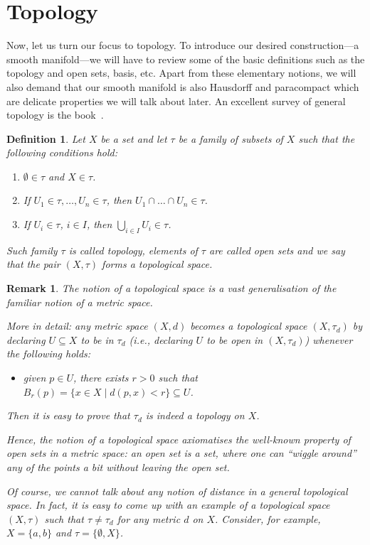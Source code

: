 \documentclass[11pt,a4paper,twoside,openany]{report}
\theoremstyle{my-theorem}
\theoremstyle{non-theorem}
\newtheorem{definition}[theorem]{Definition}
\newtheorem{remark}[theorem]{Remark}
\begin{document}
	
	\section{Topology}
	
		Now, let us turn our focus to topology. To introduce our desired construction---a smooth manifold---we will have to review some of the basic definitions such as the topology and open sets, basis, etc. Apart from these elementary notions, we will also demand that our smooth manifold is also Hausdorff and paracompact which are delicate properties we will talk about later. An excellent survey of general topology is the book~\cite{engelking:general-topology}.
		\begin{definition}
			\label{def:topology}
			Let $X$ be a set and let $\tau$ be a family of subsets of $X$ such that the following conditions hold:
			\begin{enumerate}[label=\rm(\alph*)]
				\item $\emptyset \in \tau$ and $X \in \tau$.
				\item If $U_1 \in \tau, \dots, U_n \in \tau$, then $U_1 \cap \dots \cap U_n \in \tau$.
				\item If $U_i \in \tau$, $i \in I$, then $\bigcup_{i \in I} U_i \in \tau$.
			\end{enumerate}
			Such family $\tau$ is called \emph{topology}, elements of $\tau$ are called \emph{open sets} and we say that the pair $(X,\tau)$ forms a \emph{topological space}.
		\end{definition}
		
		\begin{remark}
			The notion of a topological space is a vast generalisation of the familiar notion of a metric space.
			
			More in detail: any metric space $(X,d)$ becomes a topological space $(X,\tau_d)$ by declaring $U \subseteq X$ to be in $\tau_d$ (i.e., declaring $U$ to be open in $(X,\tau_d)$) whenever the following holds:
			\begin{itemize}
				\item[] given $p \in U$, there exists $r > 0$ such that $B_r(p) = \{x \in X \mid d(p,x) < r\} \subseteq U$.
			\end{itemize}
			Then it is easy to prove that $\tau_d$ is indeed a topology on $X$.
			
			Hence, the notion of a topological space axiomatises the well-known property of open sets in a metric space: an open set is a set, where one can ``wiggle around'' any of the points a bit without leaving the open set.
			
			Of course, we cannot talk about any notion of distance in a general topological space. In fact, it is easy to come up with an example of a topological space $(X,\tau)$ such that $\tau \neq \tau_d$ for any metric $d$ on $X$. Consider, for example, $X=\{a,b\}$ and $\tau=\{\emptyset,X\}$.
		\end{remark}
	
\end{document}

